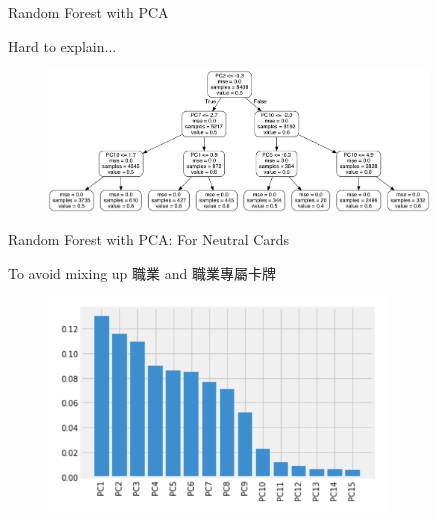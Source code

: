 \documentclass[12pt]{beamer}
\begin{document}
\begin{frame}[fragile]{Random Forest with PCA}

Hard to explain...

	\begin{figure}
		\begin{center}
			\includegraphics[width=0.9\textwidth]{figure/plot/2a.png}
		\end{center}
	\end{figure}

\end{frame}



\begin{frame}[fragile]{Random Forest with PCA: For Neutral Cards}

To avoid mixing up 職業 and 職業專屬卡牌

	\begin{figure}
		\begin{center}
			\includegraphics[width=0.8\textwidth]{figure/plot/3b.png}
		\end{center}
	\end{figure}

\end{frame}
\end{document}
